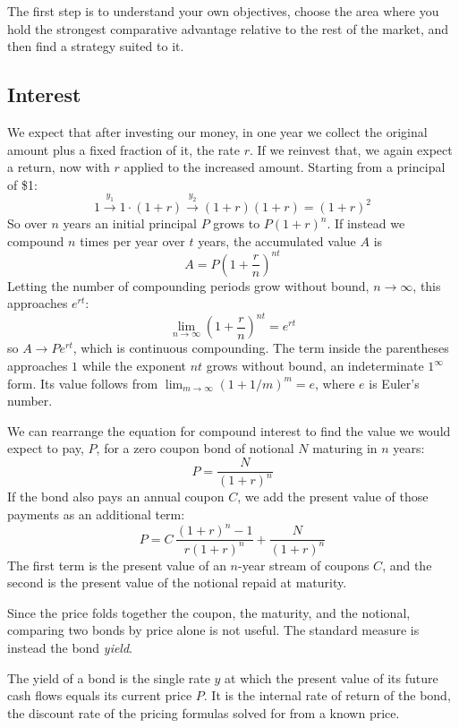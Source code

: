\bigskip

The first step is to understand your own objectives, choose the area where you hold the strongest comparative advantage relative to the rest of the market, and then find a strategy suited to it.

\bigskip

\subsection{Interest}

\medskip

We expect that after investing our money, in one year we collect the original amount plus a fixed fraction of it, the rate $r$. If we reinvest that, we again expect a return, now with $r$ applied to the increased amount. Starting from a principal of \$1:
\[
1 \xrightarrow{y_1} 1 \cdot (1 + r) \xrightarrow{y_2} (1 + r)(1 + r) = (1 + r)^2
\]
So over $n$ years an initial principal $P$ grows to $P(1 + r)^n$. If instead we compound $n$ times per year over $t$ years, the accumulated value $A$ is
\[
A = P\left(1 + \frac{r}{n}\right)^{nt}
\]
Letting the number of compounding periods grow without bound, $n \to \infty$, this approaches $e^{rt}$:
\[
\lim_{n \to \infty}\left(1 + \frac{r}{n}\right)^{nt} = e^{rt}
\]
so $A \to P e^{rt}$, which is continuous compounding. The term inside the parentheses approaches $1$ while the exponent $nt$ grows without bound, an indeterminate $1^{\infty}$ form. Its value follows from $\lim_{m \to \infty}(1 + 1/m)^m = e$, where $e$ is Euler's number.

We can rearrange the equation for compound interest to find the value we would expect to pay, $P$, for a zero coupon bond of notional $N$ maturing in $n$ years:
\[
P = \frac{N}{(1+r)^n}
\]
If the bond also pays an annual coupon $C$, we add the present value of those payments as an additional term:
\[
P = C\,\frac{(1+r)^n - 1}{r(1+r)^n} + \frac{N}{(1+r)^n}
\]
The first term is the present value of an $n$-year stream of coupons $C$, and the second is the present value of the notional repaid at maturity.

Since the price folds together the coupon, the maturity, and the notional, comparing two bonds by price alone is not useful. The standard measure is instead the bond \textit{yield}.

\begin{definition}[Yield]
The yield of a bond is the single rate $y$ at which the present value of its future cash flows equals its current price $P$. It is the internal rate of return of the bond, the discount rate of the pricing formulas solved for from a known price.
\end{definition}

